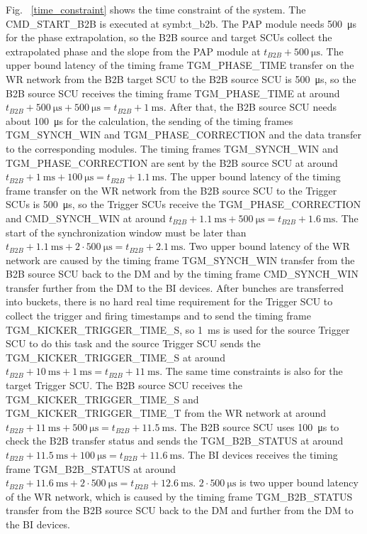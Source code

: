 Fig. ~\ref{time_constraint} shows the time constraint of the system. The CMD\_START\_B2B is executed at \gls{symb:t_b2b}. The PAP module needs \SI{500}{\us} for the phase extrapolation, so the B2B source and target SCUs collect the extrapolated phase and the slope from the PAP module at $t_\mathit{B2B} + \SI{500}{\us}$. The upper bound latency of the timing frame TGM\_PHASE\_TIME transfer on the WR network from the B2B target SCU to the B2B source SCU is \SI{500}{\us}, so the B2B source SCU receives the timing frame TGM\_PHASE\_TIME at around $t_\mathit{B2B} + \SI{500}{\us} + \SI{500}{\us} = t_\mathit{B2B} + \SI{1}{\ms}$. After that, the B2B source SCU needs about \SI{100}{\us} for the calculation, the sending of the timing frames TGM\_SYNCH\_WIN and TGM\_PHASE\_CORRECTION and the data transfer to the corresponding modules. The timing frames TGM\_SYNCH\_WIN and TGM\_PHASE\_CORRECTION are sent by the B2B source SCU at around $t_\mathit{B2B} + \SI{1}{\ms} + \SI{100}{\us} = t_\mathit{B2B} + \SI{1.1}{\ms}$. The upper bound latency of the timing frame transfer on the WR network from the B2B source SCU to the Trigger SCUs is \SI{500}{\us}, so the Trigger SCUs receive the TGM\_PHASE\_CORRECTION and CMD\_SYNCH\_WIN at around $t_\mathit{B2B} + \SI{1.1}{\ms} + \SI{500}{\us} = t_\mathit{B2B} + \SI{1.6}{\ms}$. The start of the synchronization window must be later than $t_\mathit{B2B} + \SI{1.1}{\ms} + 2\cdot\SI{500}{\us} = t_\mathit{B2B} + \SI{2.1}{\ms}$. Two upper bound latency of the WR network are caused by the timing frame TGM\_SYNCH\_WIN transfer from the B2B source SCU back to the DM and by the timing frame CMD\_SYNCH\_WIN transfer further from the DM to the BI devices. After bunches are transferred into buckets, there is no hard real time requirement for the Trigger SCU to collect the trigger and firing timestamps and to send the timing frame TGM\_KICKER\_TRIGGER\_TIME\_S, so \SI{1}{\ms} is used for the source Trigger SCU to do this task and the source Trigger SCU sends the TGM\_KICKER\_TRIGGER\_TIME\_S at around $t_\mathit{B2B} + \SI{10}{\ms} + \SI{1}{\ms} = t_\mathit{B2B} + \SI{11}{\ms}$. The same time constraints is also for the target Trigger SCU. The B2B source SCU receives the TGM\_KICKER\_TRIGGER\_TIME\_S and TGM\_KICKER\_TRIGGER\_TIME\_T from the WR network at around $t_\mathit{B2B} + \SI{11}{\ms} + \SI{500}{\us} = t_\mathit{B2B} + \SI{11.5}{\ms}$. The B2B source SCU uses \SI{100}{\us} to check the B2B transfer status and sends the TGM\_B2B\_STATUS at around $t_\mathit{B2B} + \SI{11.5}{\ms} + \SI{100}{\us} = t_\mathit{B2B} + \SI{11.6}{\ms}$. The BI devices receives the timing frame TGM\_B2B\_STATUS at around $t_\mathit{B2B} + \SI{11.6}{\ms} + 2\cdot\SI{500}{\us} = t_\mathit{B2B} + \SI{12.6}{\ms}$. $2\cdot\SI{500}{\us}$ is two upper bound latency of the WR network, which is caused by the timing frame TGM\_B2B\_STATUS transfer from the B2B source SCU back to the DM and further from the DM to the BI devices.

